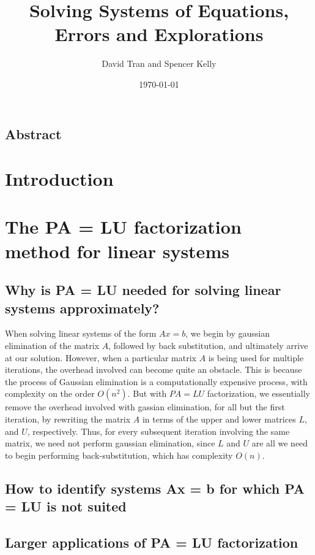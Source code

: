 \documentclass[11pt]{article}
\title{Solving Systems of Equations, Errors and Explorations}
\author{David Tran and Spencer Kelly}
\date{\today}
\begin{document}
\maketitle

\subsection*{Abstract}

\section{Introduction}

\section{The PA = LU factorization method for linear systems}

\subsection{Why is PA = LU needed for solving linear systems approximately?}

When solving linear systems of the form $Ax = b$, we begin by gaussian elimination of the matrix $A$, followed by back substitution, and ultimately arrive at our solution.
However, when a particular matrix $A$ is being used for multiple iterations, the overhead involved can become quite an obstacle.
This is because the process of Gaussian elimination is a computationally expensive process, with complexity on the order $O(n^2)$.
But with $PA = LU$ factorization, we essentially remove the overhead involved with gassian elimination, for all but the first iteration, by rewriting the matrix $A$ in terms of the upper and lower matrices $L$, and $U$, respectively.
Thus, for every subsequent iteration involving the same matrix, we need not perform gaussian elimination, since $L$ and $U$ are all we need to begin performing back-substitution, which has complexity $O(n)$.

\subsection{How to identify systems Ax = b for which PA = LU is not suited}

\subsection{Larger applications of PA = LU factorization}
\end{document}
